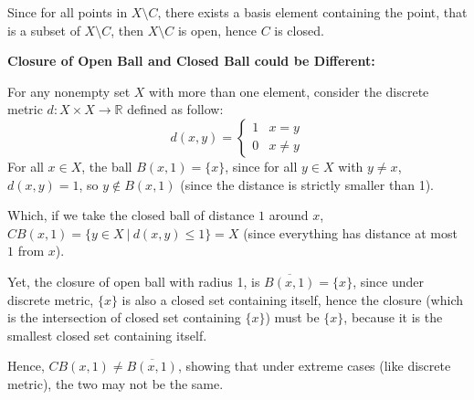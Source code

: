 \documentclass{article}
\begin{document}
Since for all points in $X\setminus C$, there exists a basis element containing the point, that is a subset of $X\setminus C$,
then $X\setminus C$ is open, hence $C$ is closed.

\hfill

\textbf{Closure of Open Ball and Closed Ball could be Different:}

For any nonempty set $X$ with more than one element, consider the discrete metric $d:X\times X\rightarrow \mathbb{R}$ defined as follow:
$$d(x,y)=\begin{cases}
    1 & x=y\\
    0 & x\neq y
\end{cases}$$
For all $x\in X$, the ball $B(x,1)=\{x\}$, since for all $y\in X$ with $y\neq x$, $d(x,y)=1$, so $y \notin B(x,1)$ (since the distance is strictly smaller than 1).

Which, if we take the closed ball of distance $1$ around $x$, $CB(x,1)=\{y\in X\ |\ d(x,y)\leq 1\}=X$ (since everything has distance at most $1$ from $x$).

Yet, the closure of open ball with radius 1, is $\overline{B(x,1)}=\{x\}$, since under discrete metric,
$\{x\}$ is also a closed set containing itself, hence the closure (which is the intersection of closed set containing $\{x\}$) must be $\{x\}$,
because it is the smallest closed set containing itself.

Hence, $CB(x,1)\neq \overline{B(x,1)}$, showing that under extreme cases (like discrete metric), the two may not be the same.
\end{document}
